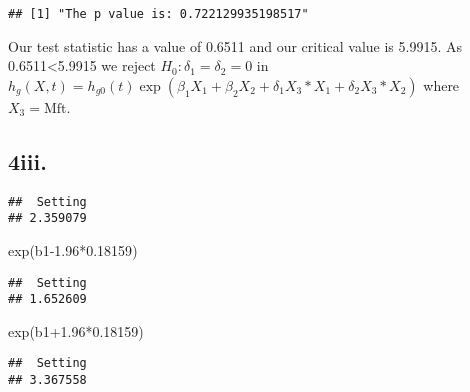\documentclass[
]{article}
\newenvironment{Shaded}{\begin{snugshade}}{\end{snugshade}}
\newcommand{\CommentTok}[1]{\textcolor[rgb]{0.56,0.35,0.01}{\textit{#1}}}
\newcommand{\DecValTok}[1]{\textcolor[rgb]{0.00,0.00,0.81}{#1}}
\newcommand{\FloatTok}[1]{\textcolor[rgb]{0.00,0.00,0.81}{#1}}
\newcommand{\FunctionTok}[1]{\textcolor[rgb]{0.00,0.00,0.00}{#1}}
\newcommand{\NormalTok}[1]{#1}
\newcommand{\OtherTok}[1]{\textcolor[rgb]{0.56,0.35,0.01}{#1}}
\newcommand{\SpecialCharTok}[1]{\textcolor[rgb]{0.00,0.00,0.00}{#1}}
\begin{document}
\begin{verbatim}
## [1] "The p value is: 0.722129935198517"
\end{verbatim}

Our test statistic has a value of 0.6511 and our critical value is
5.9915. As 0.6511\textless5.9915 we reject \(H_0: \delta_1=\delta_2=0\)
in
\(h_g(X,t)=h_{g0}(t)\exp(\beta_1 X_1+ \beta_2 X_2 + \delta_1 X_3*X_1 + \delta_2 X_3*X_2)\)
where \(X_3=\text{Mft}\).

\hypertarget{iii.}{%
\subsection{4iii.}\label{iii.}}

\begin{Shaded}
\end{Shaded}

\begin{verbatim}
##  Setting 
## 2.359079
\end{verbatim}

\begin{Shaded}
\begin{Highlighting}[]
\FunctionTok{exp}\NormalTok{(b1}\FloatTok{{-}1.96}\SpecialCharTok{*}\FloatTok{0.18159}\NormalTok{)}
\end{Highlighting}
\end{Shaded}

\begin{verbatim}
##  Setting 
## 1.652609
\end{verbatim}

\begin{Shaded}
\begin{Highlighting}[]
\FunctionTok{exp}\NormalTok{(b1}\FloatTok{+1.96}\SpecialCharTok{*}\FloatTok{0.18159}\NormalTok{)}
\end{Highlighting}
\end{Shaded}

\begin{verbatim}
##  Setting 
## 3.367558
\end{verbatim}
\end{document}
